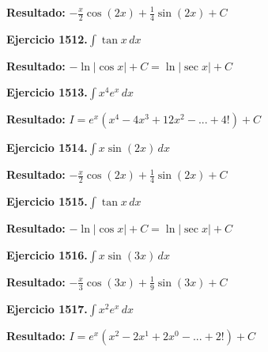 \documentclass[10pt,a4paper]{article}
\begin{document}
\begin{solbox}
\textbf{Resultado:} \(\displaystyle -\frac{x}{2}\cos(2x) + \frac{1}{4}\sin(2x) + C\)
\end{solbox}

\begin{ejbox}
\textbf{Ejercicio 1512.}\quad $\int \tan x\,dx$
\end{ejbox}

\begin{solbox}
\textbf{Resultado:} \(\displaystyle -\ln|\cos x| + C = \ln|\sec x| + C\)
\end{solbox}

\newpage
\begin{ejbox}
\textbf{Ejercicio 1513.}\quad $\int x^{4} e^x\,dx$
\end{ejbox}

\begin{solbox}
\textbf{Resultado:} \(\displaystyle I = e^x(x^{4} - 4x^{3} + 12x^{2} - ... + 4!) + C\)
\end{solbox}

\begin{ejbox}
\textbf{Ejercicio 1514.}\quad $\int x \sin(2x)\,dx$
\end{ejbox}

\begin{solbox}
\textbf{Resultado:} \(\displaystyle -\frac{x}{2}\cos(2x) + \frac{1}{4}\sin(2x) + C\)
\end{solbox}

\begin{ejbox}
\textbf{Ejercicio 1515.}\quad $\int \tan x\,dx$
\end{ejbox}

\begin{solbox}
\textbf{Resultado:} \(\displaystyle -\ln|\cos x| + C = \ln|\sec x| + C\)
\end{solbox}

\newpage
\begin{ejbox}
\textbf{Ejercicio 1516.}\quad $\int x \sin(3x)\,dx$
\end{ejbox}

\begin{solbox}
\textbf{Resultado:} \(\displaystyle -\frac{x}{3}\cos(3x) + \frac{1}{9}\sin(3x) + C\)
\end{solbox}

\begin{ejbox}
\textbf{Ejercicio 1517.}\quad $\int x^{2} e^x\,dx$
\end{ejbox}

\begin{solbox}
\textbf{Resultado:} \(\displaystyle I = e^x(x^{2} - 2x^{1} + 2x^{0} - ... + 2!) + C\)
\end{solbox}
\end{document}
